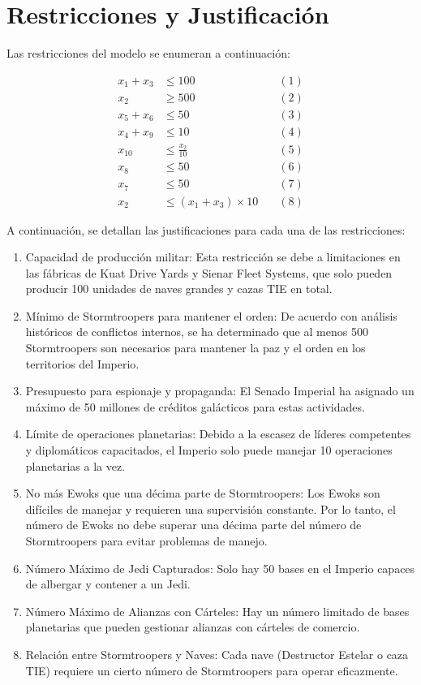 \documentclass[
	spanish, %
	oneside
]{article}
\begin{document}
\newpage

\section{Restricciones y Justificación}

Las restricciones del modelo se enumeran a continuación:

\[
\begin{aligned}
    x_1 + x_3 & \leq 100 \quad & (1) \\
    x_2 & \geq 500 \quad & (2) \\
    x_5 + x_6 & \leq 50 \quad & (3) \\
    x_4 + x_9 & \leq 10 \quad & (4) \\
    x_{10} & \leq \frac{x_2}{10} \quad & (5) \\
    x_8 & \leq 50 \quad & (6) \\
    x_7 & \leq 50 \quad & (7) \\
    x_2 & \leq (x_1 + x_3) \times 10 \quad & (8)
\end{aligned}
\]

A continuación, se detallan las justificaciones para cada una de las restricciones:

\begin{enumerate}
    \item Capacidad de producción militar: Esta restricción se debe a limitaciones en las fábricas de Kuat Drive Yards y Sienar Fleet Systems, que solo pueden producir 100 unidades de naves grandes y cazas TIE en total.
    \item Mínimo de Stormtroopers para mantener el orden: De acuerdo con análisis históricos de conflictos internos, se ha determinado que al menos 500 Stormtroopers son necesarios para mantener la paz y el orden en los territorios del Imperio.
    \item Presupuesto para espionaje y propaganda: El Senado Imperial ha asignado un máximo de 50 millones de créditos galácticos para estas actividades.
    \item Límite de operaciones planetarias: Debido a la escasez de líderes competentes y diplomáticos capacitados, el Imperio solo puede manejar 10 operaciones planetarias a la vez.
    \item No más Ewoks que una décima parte de Stormtroopers: Los Ewoks son difíciles de manejar y requieren una supervisión constante. Por lo tanto, el número de Ewoks no debe superar una décima parte del número de Stormtroopers para evitar problemas de manejo.
    \item Número Máximo de Jedi Capturados: Solo hay 50 bases en el Imperio capaces de albergar y contener a un Jedi.
    \item Número Máximo de Alianzas con Cárteles: Hay un número limitado de bases planetarias que pueden gestionar alianzas con cárteles de comercio.
    \item Relación entre Stormtroopers y Naves: Cada nave (Destructor Estelar o caza TIE) requiere un cierto número de Stormtroopers para operar eficazmente.
\end{enumerate}
\end{document}

